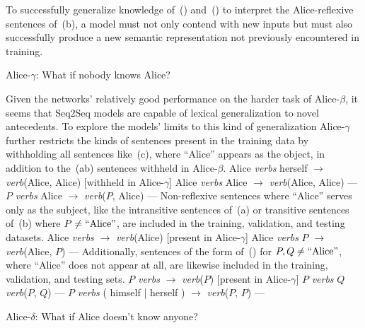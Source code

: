 To successfully generalize knowledge of~(\blastx) and~(\lastx) to interpret
the Alice-reflexive sentences of~(b), a model must
not only contend with new inputs but must also successfully produce a new 
semantic representation not previously encountered in training.

\ssec Alice-$\gamma$: What if nobody knows Alice?

Given the networks' relatively good performance on the harder task of 
Alice-$\beta$, it seems that Seq2Seq models are capable of lexical 
generalization to novel antecedents. To explore the models' limits to this
kind of generalization Alice-$\gamma$ further restricts the kinds of sentences
present in the training data by withholding all sentences like~(\nextx c), 
where ``Alice'' appears as the object, in addition to the~(\nextx ab) 
sentences withheld in Alice-$\beta$.
\pex
	\a Alice {\em verbs} herself $\to$ {\em verb}(Alice, Alice) \hfill [withheld in Alice-$\gamma$]
	\a Alice {\em verbs} Alice $\to$ {\em verb}(Alice, Alice) \hfill ---
	\a $P$ {\em verbs} Alice $\to$ {\em verb}($P$, Alice) \hfill ---
\xe
Non-reflexive sentences where ``Alice'' serves only as the subject, like the
intransitive sentences of~(\nextx a) or transitive sentences of~(\nextx b) 
where $P \not= \hbox{``Alice''}$, are included in the training, validation, and
testing datasets.
\pex
	\a Alice {\em verbs} $\to$ {\em verb}(Alice) \hfill [present in Alice-$\gamma$]
	\a Alice {\em verbs} $P$ $\to$ {\em verb}(Alice, $P$) \hfill ---
\xe
Additionally, sentences of the form of~(\nextx) for $P,Q \not= \hbox{``Alice''}$, where ``Alice'' does not appear at all, are likewise included in the
training, validation, and testing sets.
\pex
	\a $P$ {\em verbs} $\to$ {\em verb}($P$) \hfill [present in Alice-$\gamma$]
	\a $P$ {\em verbs} $Q$ {\em verb}($P$, $Q$) \hfill ---
	\a $P$ {\em verbs} ( himself | herself ) $\to$ {\em verb}($P$, $P$) \hfill ---
\xe

\ssec Alice-$\delta$: What if Alice doesn't know anyone?

